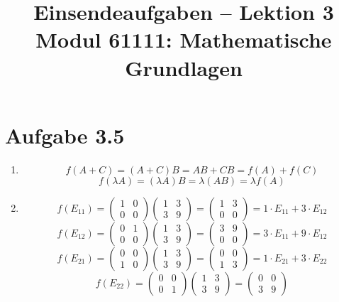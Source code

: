 \documentclass[a4paper,12pt]{article}
\title{Einsendeaufgaben -- Lektion 3\\[0.5em]
\large Modul 61111: Mathematische Grundlagen}
\author{}
\date{}
\begin{document}
\maketitle

\section*{Aufgabe 3.5}

\begin{enumerate}[label=\alph*)]

    \item
    \[
        f(A+C) = (A+C)B = AB + CB = f(A) + f(C)
    \]
    \[
        f(\lambda A) = (\lambda A)B = \lambda(AB) = \lambda f(A)
    \]

    \item
    \[
        f(E_{11}) = \begin{pmatrix}1&0\\0&0\end{pmatrix}\begin{pmatrix}1&3\\3&9\end{pmatrix} = \begin{pmatrix}1&3\\0&0\end{pmatrix}
        = 1 \cdot E_{11} + 3 \cdot E_{12}
    \]
    \[
        f(E_{12}) = \begin{pmatrix}0&1\\0&0\end{pmatrix}\begin{pmatrix}1&3\\3&9\end{pmatrix} = \begin{pmatrix}3&9\\0&0\end{pmatrix}
        = 3 \cdot E_{11} + 9 \cdot E_{12}
    \]
    \[
        f(E_{21}) = \begin{pmatrix}0&0\\1&0\end{pmatrix}\begin{pmatrix}1&3\\3&9\end{pmatrix} = \begin{pmatrix}0&0\\1&3\end{pmatrix}
        = 1 \cdot E_{21} + 3 \cdot E_{22}
    \]
    \[
        f(E_{22}) = \begin{pmatrix}0&0\\0&1\end{pmatrix}\begin{pmatrix}1&3\\3&9\end{pmatrix} = \begin{pmatrix}0&0\\3&9\end{pmatrix}
\]
\end{enumerate}
\end{document}
